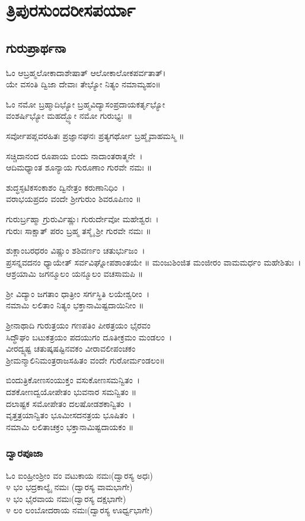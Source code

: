 
\part*{ತ್ರಿಪುರಸುಂದರೀಸಪರ್ಯಾ}
\chapter*{\center ಗುರುಪ್ರಾರ್ಥನಾ}
ಓಂ ಆಬ್ರಹ್ಮಲೋಕಾದಾಶೇಷಾತ್ ಆಲೋಕಾಲೋಕಪರ್ವತಾತ್।\\
ಯೇ ವಸಂತಿ ದ್ವಿಜಾ ದೇವಾಃ ತೇಭ್ಯೋ ನಿತ್ಯಂ ನಮಾಮ್ಯಹಂ॥

ಓಂ ನಮೋ ಬ್ರಹ್ಮಾದಿಭ್ಯೋ ಬ್ರಹ್ಮವಿದ್ಯಾಸಂಪ್ರದಾಯಕರ್ತೃಭ್ಯೋ\\ ವಂಶರ್ಷಿಭ್ಯೋ ಮಹದ್ಭ್ಯೋ ನಮೋ ಗುರುಭ್ಯಃ~॥

ಸರ್ವೋಪಪ್ಲವರಹಿತಃ ಪ್ರಜ್ಞಾನಘನಃ ಪ್ರತ್ಯಗರ್ಥೋ ಬ್ರಹ್ಮೈವಾಹಮಸ್ಮಿ ॥

ಸಚ್ಚಿದಾನಂದ ರೂಪಾಯ ಬಿಂದು ನಾದಾಂತರಾತ್ಮನೇ~।\\
ಆದಿಮಧ್ಯಾಂತ ಶೂನ್ಯಾಯ ಗುರೂಣಾಂ ಗುರವೇ ನಮಃ ॥

ಶುದ್ಧಸ್ಫಟಿಕಸಂಕಾಶಂ ದ್ವಿನೇತ್ರಂ ಕರುಣಾನಿಧಿಂ~।\\
ವರಾಭಯಪ್ರದಂ ವಂದೇ ಶ್ರೀಗುರುಂ ಶಿವರೂಪಿಣಂ ॥

ಗುರುರ್ಬ್ರಹ್ಮಾ ಗ್ರುರುರ್ವಿಷ್ಣುಃ ಗುರುರ್ದೇವೋ ಮಹೇಶ್ವರಃ~।\\
ಗುರುಃ ಸಾಕ್ಷಾತ್ ಪರಂ ಬ್ರಹ್ಮ ತಸ್ಮೈ ಶ್ರೀ ಗುರವೇ ನಮಃ ॥

ಶುಕ್ಲಾಂಬರಧರಂ ವಿಷ್ಣುಂ ಶಶಿವರ್ಣಂ ಚತುರ್ಭುಜಂ~।\\
ಪ್ರಸನ್ನವದನಂ ಧ್ಯಾಯೇತ್ ಸರ್ವವಿಘ್ನೋಪಶಾಂತಯೇ ॥
\newpage
ಮಂಜುಶಿಂಜಿತ ಮಂಜೀರಂ ವಾಮಮರ್ಧಂ ಮಹೇಶಿತುಃ~।\\
ಆಶ್ರಯಾಮಿ ಜಗನ್ಮೂಲಂ ಯನ್ಮೂಲಂ ವಚಸಾಮಪಿ ॥

ಶ್ರೀ ವಿದ್ಯಾಂ ಜಗತಾಂ ಧಾತ್ರೀಂ ಸರ್ಗಸ್ಥಿತಿ ಲಯೇಶ್ವರೀಂ~।\\
ನಮಾಮಿ ಲಲಿತಾಂ ನಿತ್ಯಂ ಭಕ್ತಾನಾಮಿಷ್ಟದಾಯಿನೀಂ ॥

ಶ್ರೀನಾಥಾದಿ ಗುರುತ್ರಯಂ ಗಣಪತಿಂ ಪೀಠತ್ರಯಂ ಭೈರವಂ\\
ಸಿದ್ಧೌಘಂ ಬಟುಕತ್ರಯಂ ಪದಯುಗಂ ದೂತೀಕ್ರಮಂ ಮಂಡಲಂ~।\\
ವೀರದ್ವ್ಯಷ್ಟ ಚತುಷ್ಕಷಷ್ಟಿನವಕಂ ವೀರಾವಲೀಪಂಚಕಂ\\
ಶ್ರೀಮನ್ಮಾಲಿನಿಮಂತ್ರರಾಜಸಹಿತಂ ವಂದೇ ಗುರೋರ್ಮಂಡಲಂ॥

ಬಿಂದುತ್ರಿಕೋಣಸಂಯುಕ್ತಂ ವಸುಕೋಣಸಮನ್ವಿತಂ~।\\
ದಶಕೋಣದ್ವಯೋಪೇತಂ ಭುವನಾರ ಸಮನ್ವಿತಂ ॥\\
ದಲಾಷ್ಟಕ ಸಮೋಪೇತಂ ದಲಷೋಡಶಕಾನ್ವಿತಂ~।\\
ವೃತ್ತತ್ರಯಾನ್ವಿತಂ ಭೂಮೀಸದನತ್ರಯ ಭೂಷಿತಂ~।\\
ನಮಾಮಿ ಲಲಿತಾಚಕ್ರಂ ಭಕ್ತಾನಾಮಿಷ್ಟದಾಯಕಂ ॥
\section{ದ್ವಾರಪೂಜಾ}
ಓಂ ಐಂಹ್ರೀಂಶ್ರೀಂ ವಂ ವಟುಕಾಯ ನಮಃ(ದ್ವಾರಸ್ಯ ಅಧಃ)\\
೪ ಭಂ ಭದ್ರಕಾಲ್ಯೈ ನಮಃ (ದ್ವಾರಸ್ಯ ವಾಮಭಾಗೇ)\\
೪ ಭಂ ಭೈರವಾಯ ನಮಃ(ದ್ವಾರಸ್ಯ ದಕ್ಷಭಾಗೇ)\\
೪ ಲಂ ಲಂಬೋದರಾಯ ನಮಃ(ದ್ವಾರಸ್ಯ ಊರ್ಧ್ವಭಾಗೇ)
